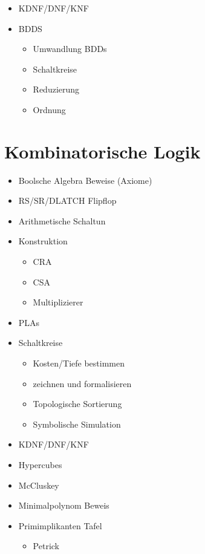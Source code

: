 \documentclass{scrartcl}[9pt, a4paper]
\begin{document}
\begin{itemize}
	\item KDNF/DNF/KNF
	\item BDDS
	      \begin{itemize}
	      	\item Umwandlung BDDs \item Schaltkreise
	      	\item Reduzierung
	      	\item Ordnung
	      \end{itemize}
\end{itemize}

\pagebreak
\section*{Kombinatorische Logik}

\begin{itemize}
	\item Boolsche Algebra Beweise (Axiome)
	\item RS/SR/DLATCH Flipflop
	\item Arithmetische Schaltun
	\item Konstruktion
	      \begin{itemize}
	      	\item CRA
	      	\item CSA
	      	\item Multiplizierer
	      \end{itemize}
	\item PLAs
	\item Schaltkreise

	      \begin{itemize}
	      	\item Kosten/Tiefe bestimmen
	      	\item zeichnen und formalisieren
	      	\item Topologische Sortierung
	      	\item Symbolische Simulation
	      \end{itemize}

	\item KDNF/DNF/KNF
	\item Hypercubes
	\item McCluskey
	\item Minimalpolynom Beweis
	\item Primimplikanten Tafel
	      \begin{itemize}
	      	\item Petrick
	      \end{itemize}
\end{itemize}
\end{document}
